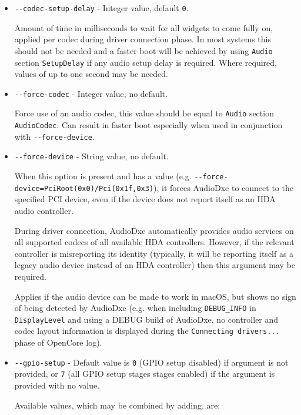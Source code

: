 \documentclass[]{article}
\providecommand{\tightlist}{%
  \setlength{\itemsep}{0pt}\setlength{\parskip}{0pt}}
\begin{document}
\begin{itemize}
  \tightlist
  \item \texttt{-{}-codec-setup-delay} - Integer value, default \texttt{0}. \medskip

  Amount of time in milliseconds to wait for all widgets to come fully on, applied per codec
  during driver connection phase. In most systems this should not be needed and a faster boot
  will be achieved by using \texttt{Audio} section \texttt{SetupDelay} if any audio setup delay
  is required. Where required, values of up to one second may be needed. \medskip

  \item \texttt{-{}-force-codec} - Integer value, no default. \medskip

  Force use of an audio codec, this value should be equal to \texttt{Audio} section \texttt{AudioCodec}.
  Can result in faster boot especially when used in conjunction with \texttt{-{}-force-device}. \medskip

  \item \texttt{-{}-force-device} - String value, no default. \medskip

  When this option is present and has a value (e.g. \texttt{-{}-force-device=PciRoot(0x0)/Pci(0x1f,0x3)}), it
  forces AudioDxe to connect to the specified PCI device, even if the device does not report itself as
  an HDA audio controller.

  During driver connection, AudioDxe automatically provides audio services on all supported codecs of
  all available HDA controllers. However, if the relevant controller is misreporting its identity
  (typically, it will be reporting itself as a legacy audio device instead of an HDA controller)
  then this argument may be required.

  Applies if the audio device can be made to work in macOS, but shows no sign of being detected by AudioDxe
  (e.g. when including \texttt{DEBUG\_INFO} in \texttt{DisplayLevel} and using a DEBUG build of AudioDxe,
  no controller and codec layout information is displayed during the \texttt{Connecting drivers...}
  phase of OpenCore log). \medskip

  \item \texttt{-{}-gpio-setup} - Default value is \texttt{0} (GPIO setup disabled) if argument is not provided,
  or \texttt{7} (all GPIO setup stages stages enabled) if the argument is provided with no value. \medskip

  Available values, which may be combined by adding, are: \medskip


\end{itemize}
\end{document}
